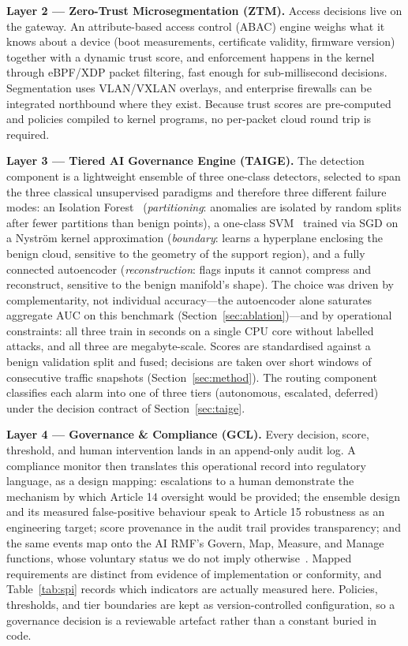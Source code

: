 \documentclass[sigconf,review,anonymous]{acmart}
\begin{document}
\textbf{Layer 2 --- Zero-Trust Microsegmentation (ZTM).} Access decisions live on the gateway. An attribute-based access control (ABAC) engine weighs what it knows about a device (boot measurements, certificate validity, firmware version) together with a dynamic trust score, and enforcement happens in the kernel through eBPF/XDP packet filtering, fast enough for sub-millisecond decisions. Segmentation uses VLAN/VXLAN overlays, and enterprise firewalls can be integrated northbound where they exist. Because trust scores are pre-computed and policies compiled to kernel programs, no per-packet cloud round trip is required.

\textbf{Layer 3 --- Tiered AI Governance Engine (TAIGE).} The detection component is a lightweight ensemble of three one-class detectors, selected to span the three classical unsupervised paradigms and therefore three different failure modes: an Isolation Forest~\cite{liu2008iforest} (\emph{partitioning}: anomalies are isolated by random splits after fewer partitions than benign points), a one-class SVM~\cite{scholkopf2001ocsvm} trained via SGD on a Nystr\"om kernel approximation (\emph{boundary}: learns a hyperplane enclosing the benign cloud, sensitive to the geometry of the support region), and a fully connected autoencoder (\emph{reconstruction}: flags inputs it cannot compress and reconstruct, sensitive to the benign manifold's shape). The choice was driven by complementarity, not individual accuracy---the autoencoder alone saturates aggregate AUC on this benchmark (Section~\ref{sec:ablation})---and by operational constraints: all three train in seconds on a single CPU core without labelled attacks, and all three are megabyte-scale. Scores are standardised against a benign validation split and fused; decisions are taken over short windows of consecutive traffic snapshots (Section~\ref{sec:method}). The routing component classifies each alarm into one of three tiers (autonomous, escalated, deferred) under the decision contract of Section~\ref{sec:taige}.

\textbf{Layer 4 --- Governance \& Compliance (GCL).} Every decision, score, threshold, and human intervention lands in an append-only audit log. A compliance monitor then translates this operational record into regulatory language, as a design mapping: escalations to a human demonstrate the mechanism by which Article 14 oversight would be provided; the ensemble design and its measured false-positive behaviour speak to Article 15 robustness as an engineering target; score provenance in the audit trail provides transparency; and the same events map onto the AI RMF's Govern, Map, Measure, and Manage functions, whose voluntary status we do not imply otherwise~\cite{nistairmfvoluntary}. Mapped requirements are distinct from evidence of implementation or conformity, and Table~\ref{tab:spi} records which indicators are actually measured here. Policies, thresholds, and tier boundaries are kept as version-controlled configuration, so a governance decision is a reviewable artefact rather than a constant buried in code.
\end{document}
